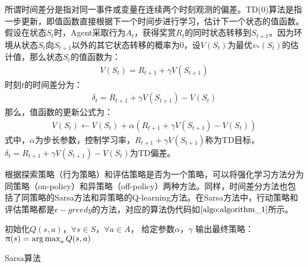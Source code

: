 所谓时间差分是指对同一事件或变量在连续两个时刻观测的偏差。TD(0)算法是指一步更新，即值函数直接根据下一个时间步进行学习，估计下一个状态的值函数。
假设在状态$S_{t}$时，Agent采取行为$A_{t}$，获得奖赏$R_{t}$的同时状态转移到$S_{t+1}$。因为环境从状态$S_{t}$向$S_{t+1}$以外的其它状态转移的概率为0，设$V(S_{t})$为最优$v_{*}(S_{t})$的估计值，那么状态$S_{t}$的值函数为：
\begin{equation}
\begin{aligned}
V(S_{t})=R_{t+1}+\gamma V(S_{t+1})
\end{aligned}
\end{equation}
时刻$t$的时间差分为：
\begin{equation}\label{shijiachafen}
\begin{aligned}
\delta_{t}=R_{t+1}+\gamma V(S_{t+1})-V(S_{t})
\end{aligned}
\end{equation}
那么，值函数的更新公式为：
\begin{equation}
\begin{aligned}
V(S_{t}) \gets V(S_{t})+\alpha (R_{t+1}+\gamma V(S_{t+1})-V(S_{t}))
\end{aligned}
\end{equation}
式中，$\alpha$为步长参数，控制学习率，$R_{t+1}+\gamma V(S_{t+1})$称为TD目标，$\delta_{t}=R_{t+1}+\gamma V(S_{t+1})-V(S_{t})$为TD偏差。

根据探索策略（行为策略）和评估策略是否为一个策略，可以将强化学习方法分为同策略（on-policy）和异策略（off-policy）两种方法。同样，时间差分方法也包括了同策略的Sarsa方法和异策略的Q-learning方法。在Sarsa方法中，行动策略和评估策略都是$\epsilon-greedy$的方法，对应的算法伪代码如$\ref{algo:algorithm_1}$所示。

\begin{algorithm}[htbp]
\small
\SetAlgoLined
{} 
初始化$Q(s,a)$，$\forall s \in S$，$\forall a \in A$， 给定参数$\alpha$，$\gamma$\;
输出最终策略：$\uppi(s)=\operatorname*{arg\,max}_{a}Q(s,a)$\;
\caption{Sarsa算法}
\label{algo:algorithm_1}
\end{algorithm}

